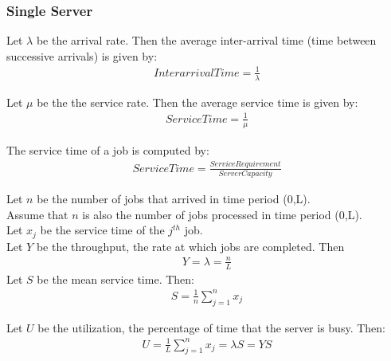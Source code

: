 

\subsubsection{Single Server}

Let $\lambda$ be the arrival rate. Then the average inter-arrival time (time
between successive arrivals) is given by:
\begin{equation*} \begin{split}
	InterarrivalTime = \frac{1}{\lambda}
\end{split} \end{equation*}

Let $\mu$ be the the service rate. Then the average service time is given by:
\begin{equation*} \begin{split}
	ServiceTime = \frac{1}{\mu}
\end{split} \end{equation*}

The service time of a job is computed by:
\begin{equation*} \begin{split}
	ServiceTime = \frac{ServiceRequirement}{ServerCapacity}
\end{split} \end{equation*}

Let $n$ be the number of jobs that arrived in time period (0,L). \\
Assume that $n$ is also the number of jobs processed in time period (0,L). \\
Let $x_j$ be the service time of the $j^{th}$ job. \\
Let $Y$ be the throughput, the rate at which jobs are completed. Then
\begin{equation*} \begin{split}
	Y = \lambda = \frac{n}{L}
\end{split} \end{equation*}
Let $S$ be the mean service time. Then:
\begin{equation*} \begin{split}
	S = \frac{1}{n} \sum_{j=1}^n x_j
\end{split} \end{equation*}

Let $U$ be the utilization, the percentage of time that the server is busy.
Then:
\begin{equation*} \begin{split}
	U = \frac{1}{L} \sum_{j=1}^n x_j = \lambda S = Y S
\end{split} \end{equation*}


